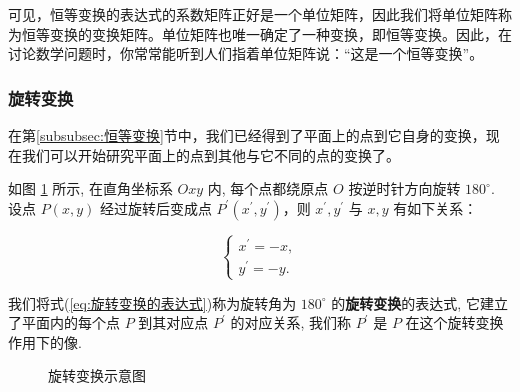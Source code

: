 \documentclass[lang=cn,newtx,10pt,scheme=chinese]{elegantbook}
\begin{document}
可见，恒等变换的表达式的系数矩阵正好是一个单位矩阵，因此我们将单位矩阵称为恒等变换的\textcolor{third}{变换矩阵}。单位矩阵也唯一确定了一种变换，即恒等变换。因此，在讨论数学问题时，你常常能听到人们指着单位矩阵说：“这是一个恒等变换”。

\subsubsection{旋转变换}
\label{subsubsec:旋转变换}

在第\ref{subsubsec:恒等变换}节中，我们已经得到了平面上的点到它自身的变换，现在我们可以开始研究平面上的点到其他与它不同的点的变换了。

如图 \ref{fig:旋转变换} 所示, 在直角坐标系 $O x y$ 内, 每个点都绕原点 $O$ 按逆时针方向旋转 $180^{\circ}$. 设点 $P(x, y)$ 经过旋转后变成点 $P^{\prime}\left(x^{\prime}, y^{\prime}\right)$，则 $x^{\prime}, y^{\prime}$ 与 $x, y$ 有如下关系：

\begin{equation}
\left\{\begin{array}{l}
x^{\prime}=-x, \\
y^{\prime}=-y .
\end{array}\right.
\label{eq:旋转变换的表达式}
\end{equation}

我们将式(\ref{eq:旋转变换的表达式})称为旋转角为 $180^{\circ}$ 的\textcolor{third}{\bf 旋转变换}的表达式, 它建立了平面内的每个点 $P$ 到其对应点 $P^{\prime}$ 的对应关系, 我们称 $P^{\prime}$ 是 $P$ 在这个旋转变换作用下的像.

\begin{figure}[h]
\centering
{}
\caption{旋转变换示意图\label{fig:旋转变换}}
\end{figure}
\end{document}
